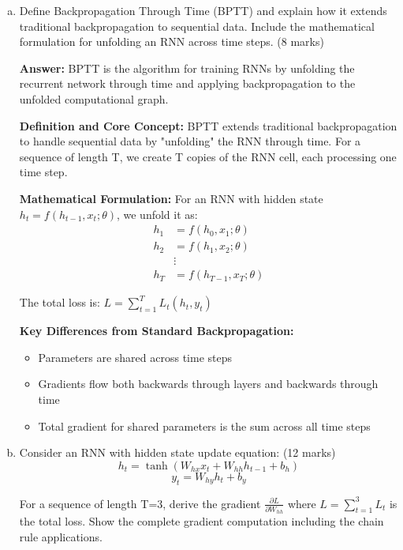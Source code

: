 \documentclass[12pt]{article}
\newcommand{\answer}[1]{{\color{answercolor}\textbf{Answer:} #1}}
\newcommand{\explanation}[1]{{\color{explanationcolor}#1}}
\begin{document}
\begin{enumerate}[(a)]
    \item Define Backpropagation Through Time (BPTT) and explain how it extends traditional backpropagation to sequential data. Include the mathematical formulation for unfolding an RNN across time steps. \hfill (8 marks)
    
    \answer{BPTT is the algorithm for training RNNs by unfolding the recurrent network through time and applying backpropagation to the unfolded computational graph.}
    
    \explanation{
    \textbf{Definition and Core Concept:}
    BPTT extends traditional backpropagation to handle sequential data by "unfolding" the RNN through time. For a sequence of length T, we create T copies of the RNN cell, each processing one time step.
    
    \textbf{Mathematical Formulation:}
    For an RNN with hidden state $h_t = f(h_{t-1}, x_t; \theta)$, we unfold it as:
    \begin{align}
        h_1 &= f(h_0, x_1; \theta) \\
        h_2 &= f(h_1, x_2; \theta) \\
        &\vdots \\
        h_T &= f(h_{T-1}, x_T; \theta)
    \end{align}
    
    The total loss is: $L = \sum_{t=1}^T L_t(h_t, y_t)$
    
    \textbf{Key Differences from Standard Backpropagation:}
    \begin{itemize}
        \item Parameters are shared across time steps
        \item Gradients flow both backwards through layers and backwards through time
        \item Total gradient for shared parameters is the sum across all time steps
    \end{itemize}
    }
    
    \item Consider an RNN with hidden state update equation: \hfill (12 marks)
    $$h_t = \tanh(W_{hx} x_t + W_{hh} h_{t-1} + b_h)$$
    $$y_t = W_{hy} h_t + b_y$$
    
    For a sequence of length T=3, derive the gradient $\frac{\partial L}{\partial W_{hh}}$ where $L = \sum_{t=1}^3 L_t$ is the total loss. Show the complete gradient computation including the chain rule applications.
    

\end{enumerate}
\end{document}
